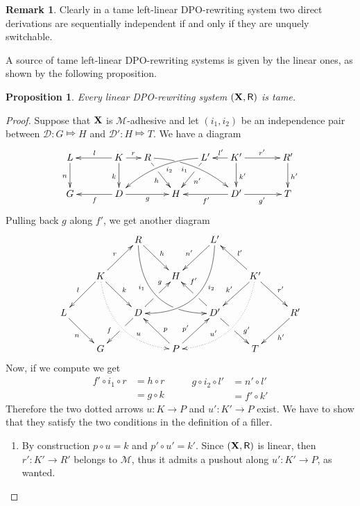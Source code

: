 \documentclass[a4paper]{article}
\def\R{\mathsf{R}}
\def\X{\textbf {\textup{X}}}
\newcommand{\dder}[1]{\mathscr{#1}}
\newtheorem{proposition}[theorem]{Proposition}
\theoremstyle{definition}
\newtheorem{remark}[theorem]{Remark}
\begin{document}
\begin{remark}
  Clearly in a tame left-linear DPO-rewriting system two direct derivations are sequentially independent if and only if they are unquely switchable.
\end{remark}

A source of tame left-linear DPO-rewriting systems is given by the linear ones, as shown by the following proposition.

\begin{proposition}\label{prop:equi}Every linear DPO-rewriting system $(\X, \R)$ is tame.
 \end{proposition}
\begin{proof} Suppose that $\X$ is $\mathcal{M}$-adhesive and let $(i_1, i_2)$ be an independence pair between $\dder{D}\colon G\Mapsto H$ and $\dder{D}'\colon H\Mapsto T$. We have a diagram
	\[\xymatrix@C=15pt{L \ar[d]_{n}&& K \ar[d]_{k}\ar[ll]_{l} \ar[r]^{r} & R \ar@/^.35cm/[drrr]|(.3)\hole_(.4){i_1} \ar[dr]|(.3)\hole_{h} && L' \ar@/_.35cm/[dlll]^(.4){i_2} \ar[dl]|(.3)\hole^{n'}& K' \ar[d]^{k'}\ar[l]_{l'} \ar[rr]^{r'} && R' \ar[d]^{h'}\\G && \ar[ll]^{f} D \ar[rr]_{g}&& H  && \ar[ll]^{f'} D' \ar[rr]_{g'}&& T}\]
Pulling back $g$ along $f'$, we get another diagram 
	\[\xymatrix{&&R \ar@/_1cm/[ddrr]_(.35){i_1}|(.7)\hole \ar[dr]^{h}&& L'\ar@/^1cm/[ddll]^(.35){i_2}  \ar[dl]_{n'}\\&K\ar[dr]^{k}\ar[dl]_{l} \ar@{.>}@/_.8cm/[ddrr]^(.65){u}\ar[ur]^{r}&& H && K' \ar@{.>}@/^.8cm/[ddll]_(.65){u'}\ar[dl]_{k'}\ar[lu]_{l'} \ar[dr]^{r'}\\L \ar[dr]_{n} && D \ar[dl]|(.42)\hole_(.64){f}\ar[ur]|(.48)\hole^(.7){g}&&D' \ar[dr]|(.42)\hole^(.65){g'} \ar[ul]|(.48)\hole_(.7){f'}&&R'\ar[dl]^{h'}\\&G &&P\ar[ur]^(.4){p'}\ar[ul]_(.4){p}&&T}\] 
Now, if we compute we get
\[\begin{split}
	f'\circ i_1\circ r &= h\circ r \\&= g\circ k
\end{split}\qquad \begin{split}
g\circ i_2\circ l' &= n'\circ l'\\&=f'\circ k'
\end{split}\]
Therefore the two dotted arrows $u\colon K\to P$ and $u'\colon K'\to P$ exist. We have to show that they satisfy the two conditions in the definition of a filler. 
\begin{enumerate}
	\item  By construction $p\circ u = k$ and $p'\circ u'=k'$. Since $(\X, \R)$ is linear, then $r'\colon K'\to R'$ belongs to $\mathcal{M}$, thus it admits a pushout along $u'\colon K'\to P$, as wanted.

\end{enumerate}
\end{proof}
\end{document}
